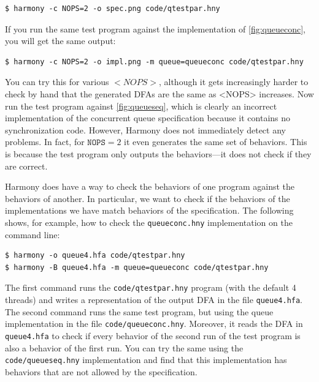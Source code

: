 \documentclass{report}
\newenvironment{code}{
\tcolorbox
}{
\endtcolorbox
}
\begin{document}
\begin{code}
\begin{verbatim}
$ harmony -c NOPS=2 -o spec.png code/qtestpar.hny
\end{verbatim}
\end{code}

If you run the same test program against the implementation
of \autoref{fig:queueconc}, you will get the same output:

\begin{code}
\begin{verbatim}
$ harmony -c NOPS=2 -o impl.png -m queue=queueconc code/qtestpar.hny
\end{verbatim}
\end{code}

You can
try this for various $<{NOPS}>$, although it gets increasingly
harder to check by hand that the generated DFAs are the same as
<{NOPS}> increases.
Now run the test program against \autoref{fig:queueseq}, which is
clearly an incorrect implementation of the concurrent queue specification
because it contains no synchronization code.
However, Harmony does not immediately detect
any problems.  In fact, for $\mathtt{NOPS} = 2$ it even generates
the same set of behaviors.
This is because the test program only outputs the behaviors---it does
not check if they are correct.

Harmony does have a way to check the behaviors of one program against
the behaviors of another.  In particular, we want to check if the
behaviors of the implementations we have match behaviors of the
specification.  The following shows, for example, how to check the
\texttt{queueconc.hny} implementation on the command line:

\begin{code}
\begin{verbatim}
$ harmony -o queue4.hfa code/qtestpar.hny
$ harmony -B queue4.hfa -m queue=queueconc code/qtestpar.hny
\end{verbatim}
\end{code}

The first command runs the \texttt{code/qtestpar.hny} program (with the
default 4 threads)
and writes a representation of the output DFA in the file \texttt{queue4.hfa}.
The second command runs the same test program, but using the queue
implementation in the file \texttt{code/queueconc.hny}.  Moreover, it reads
the DFA in \texttt{queue4.hfa} to check if every behavior of the second
run of the test program is also a behavior of the first run.
You can try the same using the \texttt{code/queueseq.hny} implementation
and find that this implementation has behaviors that are not allowed by
the specification.
\end{document}
